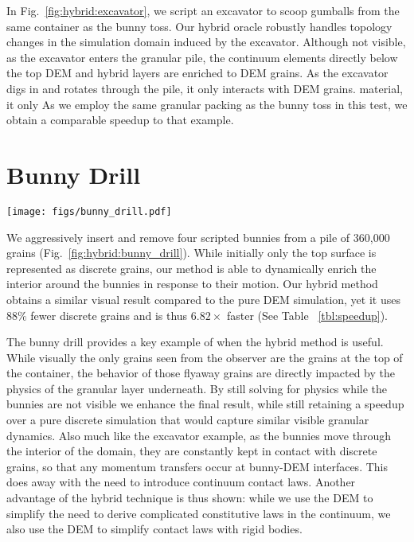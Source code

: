 In Fig.~\ref{fig:hybrid:excavator}, we script an excavator to scoop gumballs from the same container as the bunny toss. Our hybrid oracle robustly handles topology changes in the simulation domain induced by the excavator. Although not visible, as the excavator enters the granular pile, the continuum elements directly below the top DEM and hybrid layers are enriched to DEM grains. As the excavator digs in and rotates through the pile, it only interacts with DEM grains. material, it only  As we employ the same granular packing as the bunny toss in this test, we obtain a comparable speedup to that example.

\section{Bunny Drill}
 \begin{center}
 \centering
 \texttt{[image: figs/bunny\_drill.pdf]}
 \label{fig:hybrid:bunny_drill}
 \end{center}
 
We aggressively insert and remove four scripted bunnies from a pile of 360,000 grains (Fig.~\ref{fig:hybrid:bunny_drill}). While initially only the top surface is represented as discrete grains, our method is able to dynamically enrich the interior around the bunnies in response to their motion. Our hybrid method obtains a similar visual result compared to the pure DEM simulation, yet it uses $88\%$ fewer discrete grains and is thus $6.82\times$ faster (See Table ~\ref{tbl:speedup}).

The bunny drill provides a key example of when the hybrid method is useful. While visually the only grains seen from the observer are the grains at the top of the container, the behavior of those flyaway grains are directly impacted by the physics of the granular layer underneath. By still solving for physics while the bunnies are not visible we enhance the final result, while still retaining a speedup over a pure discrete simulation that would capture similar visible granular dynamics. Also much like the excavator example, as the bunnies move through the interior of the domain, they are constantly kept in contact with discrete grains, so that any momentum transfers occur at bunny-DEM interfaces. This does away with the need to introduce continuum contact laws. Another advantage of the hybrid technique is thus shown: while we use the DEM to simplify the need to derive complicated constitutive laws in the continuum, we also use the DEM to simplify contact laws with rigid bodies.

